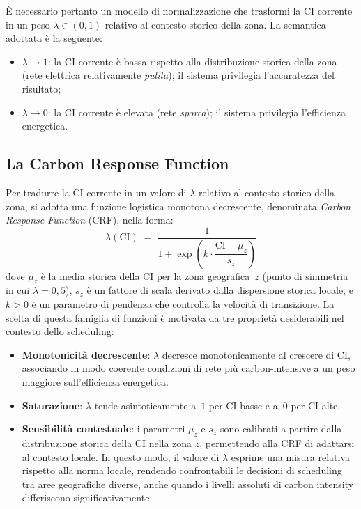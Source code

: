 È necessario pertanto un modello di normalizzazione che trasformi la
CI corrente in un peso $\lambda \in (0,1)$ relativo al contesto storico
della zona. La semantica adottata è la seguente:
%
\begin{itemize}
    \item $\lambda \to 1$: la CI corrente è bassa rispetto alla
    distribuzione storica della zona (rete elettrica relativamente
    \emph{pulita}); il sistema privilegia l'accuratezza del risultato;
    \item $\lambda \to 0$: la CI corrente è elevata (rete
    \emph{sporca}); il sistema privilegia l'efficienza energetica.
\end{itemize}

\subsection{La Carbon Response Function}
\label{sec:crf:calibrazione}

Per tradurre la CI corrente in un valore di $\lambda$ relativo al
contesto storico della zona, si adotta una funzione logistica monotona
decrescente, denominata \emph{Carbon Response Function} (CRF), nella forma:
%
\begin{equation}
    \lambda(\mathrm{CI}) \;=\;
        \frac{1}
             {1 + \exp\!\left(k \cdot
                 \dfrac{\mathrm{CI} - \mu_z}{s_z}\right)}
    \label{eq:crf}
\end{equation}
%
dove $\mu_z$ è la media storica della CI per la zona geografica~$z$
(punto di simmetria in cui $\lambda = 0{,}5$), $s_z$ è un fattore di
scala derivato dalla dispersione storica locale, e $k > 0$ è un
parametro di pendenza che controlla la velocità di transizione.
La scelta di questa famiglia di funzioni è motivata da tre proprietà
desiderabili nel contesto dello scheduling:
%
\begin{itemize}
    \item \textbf{Monotonicità decrescente}: $\lambda$ decresce
    monotonicamente al crescere di CI, associando in modo coerente
    condizioni di rete più carbon-intensive a un peso maggiore
    sull'efficienza energetica.

    \item \textbf{Saturazione}: $\lambda$ tende asintoticamente a~$1$
    per CI basse e a~$0$ per CI alte.

    \item \textbf{Sensibilità contestuale}: i parametri $\mu_z$ e $s_z$
    sono calibrati a partire dalla distribuzione storica della CI nella
    zona $z$, permettendo alla CRF di adattarsi al contesto locale.
    In questo modo, il valore di $\lambda$ esprime una misura relativa
    rispetto alla norma locale, rendendo confrontabili le decisioni di
    scheduling tra aree geografiche diverse, anche quando i livelli
    assoluti di carbon intensity differiscono significativamente.
\end{itemize}

